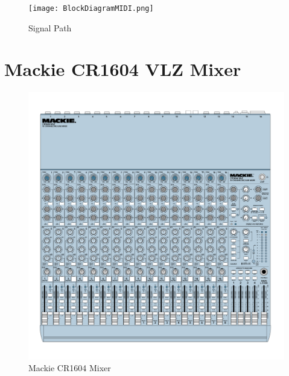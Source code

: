 \documentclass{tufte-book} %
\begin{document}
\begin{figure}[h]
\centering
\texttt{[image: BlockDiagramMIDI.png]}
\caption{Signal Path }
\label{fig:fullfig}


\end{figure}


\newpage
\section{Mackie CR1604 VLZ Mixer}

\begin{fullwidth}
\lipsum[5]
\end{fullwidth}

\begin{figure}[h]
\centering
\includegraphics[width=.85\textwidth]{LaTeX/Mackie_Manual-1.png}
\caption{Mackie CR1604 Mixer}
\label{fig:fullfig}
\end{figure}

\newpage
\end{document}
